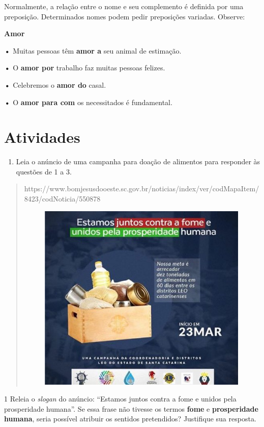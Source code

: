 {\begin{itemize}
\begin{itemize}
{Normalmente, a relação entre o nome e seu complemento é definida por uma
preposição. Determinados nomes podem pedir preposições variadas.
Observe:

\textbf{Amor}

\textbf{•} Muitas pessoas têm \textbf{amor a} seu animal de estimação.

\textbf{•} O \textbf{amor por} trabalho faz muitas pessoas felizes.

\textbf{•} Celebremos o \textbf{amor do} casal.

\textbf{•} O \textbf{amor para com} os necessitados é fundamental.
}

\section{Atividades}

\begin{enumerate}
\def\labelenumi{\arabic{enumi}.}
\tightlist
\item
  Leia o anúncio de uma campanha para doação de alimentos para responder
  às questões de 1 a 3.
\end{enumerate}

\begin{quote}
https://www.bomjesusdooeste.sc.gov.br/noticias/index/ver/codMapaItem/8423/codNoticia/550878

\begin{figure}
\centering
\includegraphics[width=3.95833in,height=3.54167in]{./_SAEB_9_POR/media/image31.jpeg}
\caption{}
\end{figure}
\end{quote}

\num{1} Releia o \emph{slogan} do anúncio: ``Estamos juntos contra a
fome e unidos pela prosperidade humana''. Se essa frase não tivesse os
termos \textbf{fome} e \textbf{prosperidade humana}, seria possível
atribuir os sentidos pretendidos? Justifique sua resposta. 


\end{itemize}
\end{itemize}}

